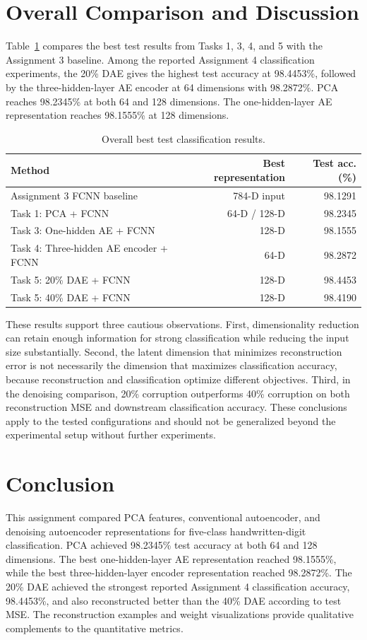 \documentclass[conference,onecolumn]{IEEEtran}
\begin{document}

\FloatBarrier

\section{Overall Comparison and Discussion}
Table~\ref{tab:overall} compares the best test results from Tasks 1, 3, 4, and 5 with the Assignment 3 baseline. Among the reported Assignment 4 classification experiments, the 20\% DAE gives the highest test accuracy at 98.4453\%, followed by the three-hidden-layer AE encoder at 64 dimensions with 98.2872\%. PCA reaches 98.2345\% at both 64 and 128 dimensions. The one-hidden-layer AE representation reaches 98.1555\% at 128 dimensions.

\begin{table}[H]
\centering
\caption{Overall best test classification results.}
\label{tab:overall}
\begin{tabular}{l r r}
\toprule
Method & Best representation & Test acc. (\%)\\
\midrule
Assignment 3 FCNN baseline & 784-D input & 98.1291\\
Task 1: PCA + FCNN & 64-D / 128-D & 98.2345\\
Task 3: One-hidden AE + FCNN & 128-D & 98.1555\\
Task 4: Three-hidden AE encoder + FCNN & 64-D & 98.2872\\
Task 5: 20\% DAE + FCNN & 128-D & 98.4453\\
Task 5: 40\% DAE + FCNN & 128-D & 98.4190\\
\bottomrule
\end{tabular}
\end{table}

These results support three cautious observations. First, dimensionality reduction can retain enough information for strong classification while reducing the input size substantially. Second, the latent dimension that minimizes reconstruction error is not necessarily the dimension that maximizes classification accuracy, because reconstruction and classification optimize different objectives. Third, in the denoising comparison, 20\% corruption outperforms 40\% corruption on both reconstruction MSE and downstream classification accuracy. These conclusions apply to the tested configurations and should not be generalized beyond the experimental setup without further experiments.

\section{Conclusion}
This assignment compared PCA features, conventional autoencoder, and denoising autoencoder representations for five-class handwritten-digit classification. PCA achieved 98.2345\% test accuracy at both 64 and 128 dimensions. The best one-hidden-layer AE representation reached 98.1555\%, while the best three-hidden-layer encoder representation reached 98.2872\%. The 20\% DAE achieved the strongest reported Assignment 4 classification accuracy, 98.4453\%, and also reconstructed better than the 40\% DAE according to test MSE. The reconstruction examples and weight visualizations provide qualitative complements to the quantitative metrics.
\end{document}
